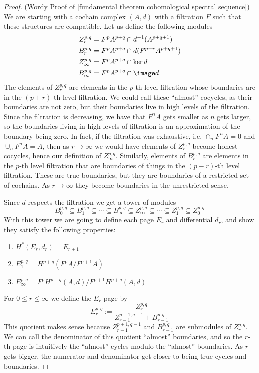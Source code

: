 \begin{proof}(Wordy Proof of \ref{fundamental theorem cohomological spectral sequence})
We are starting with a cochain complex $(A,d)$ with a filtration $F$ such that these structures are compatible. Let us define the following modules
\begin{align*}
	Z_r^{p,q} &= F^p A^{p+q} \cap d^{-1} (A^{p+q+1}) \\
	B_r^{p,q} &= F^p A^{p+q} \cap d(F^{p-r} A^{p+q+1}) \\
	Z_\infty^{p,q} &= F^p A^{p+q} \cap \ker d \\
	B_\infty^{p,q} &= F^p A^{p+q} \cap \image d
\end{align*}
The elements of $Z_r^{p,q}$ are elements in the $p$-th level filtration whose boundaries are in the $(p+r)$-th level filtration. We could call these ``almost'' cocycles, as their boundaries are not zero, but their boundaries live in high levels of the filtration. Since the filtration is decreasing, we have that $F^n A$ gets smaller as $n$ gets larger, so the boundaries living in high levels of filtration is an approximation of the boundary being zero. In fact, if the filtration was exhaustive, i.e. $\cap_n F^n A = 0$ and $\cup_n F^n A = A$, then as $r \to \infty$ we would have elements of $Z_r^{p,q}$ become honest cocycles, hence our definition of $Z_\infty^{p,q}$. Similarly, elements of $B_r^{p,q}$ are elements in the $p$-th level filtration that are boundaries of things in the $(p-r)$-th level filtration. These are true boundaries, but they are boundaries of a restricted set of cochains. As $r \to \infty$ they become boundaries in the unrestricted sense.

Since $d$ respects the filtration we get a tower of modules
\[ B_0^{p,q} \subseteq B_1^{p,q} \subseteq \cdots \subseteq B_\infty^{p,q} \subseteq Z_\infty^{p,q} \subseteq \cdots \subseteq Z_1^{p,q} \subseteq Z_0^{p,q} \]
With this tower we are going to define each page $E_r$ and differential $d_r$, and show they satisfy the following properties:
\begin{enumerate}
	\item $H^*(E_r,d_r) = E_{r+1}$
	\item $E_1^{p,q} = H^{p+q}(F^p A / F^{p+1} A)$
	\item $E_\infty^{p,q} = F^p H^{p+q}(A,d) / F^{p+1} H^{p+q}(A,d)$
\end{enumerate}
For $0 \leq r \leq \infty$ we define the $E_r$ page by
\begin{equation}
\label{definition of E_r-page}
E_r^{p,q} := \frac{Z_r^{p,q}}{Z_{r-1}^{p+1,q-1} + B_{r-1}^{p,q}}
\end{equation}
This quotient makes sense because $Z_{r-1}^{p+1,q-1}$ and $B_{r-1}^{p,q}$ are submodules of $Z_r^{p,q}$. We can call the denominator of this quotient ``almost'' boundaries, and so the $r$-th page is intuitively the ``almost'' cycles modulo the ``almost'' boundaries. As $r$ gets bigger, the numerator and denominator get closer to being true cycles and boundaries.


\end{proof}
